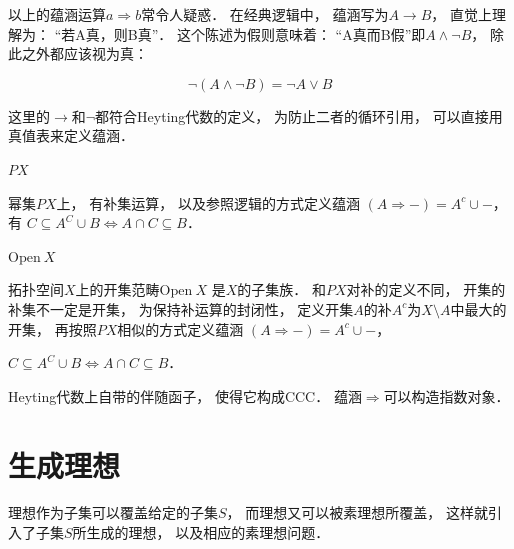 以上的蕴涵运算$a \Rightarrow b$常令人疑惑．
在经典逻辑中，
蕴涵写为$A \to B$，
直觉上理解为：
“若A真，则B真”．
这个陈述为假则意味着：
“A真而B假”即$A \wedge \neg B$，
除此之外都应该视为真：

$$
\neg (A \wedge \neg B) = \neg A \vee B
$$

这里的$\rightarrow$和$\neg$都符合Heyting代数的定义，
为防止二者的循环引用，
可以直接用真值表来定义蕴涵．

\begin{example}{$PX$}

幂集$PX$上，
有补集运算，
以及参照逻辑的方式定义蕴涵
$(A \Rightarrow -) = A^c \cup -$，
有
$C \subseteq A^C \cup B 
\Longleftrightarrow 
A \cap C \subseteq B$．

\end{example}

\begin{example}{$\text{Open} \ X$}

拓扑空间$X$上的开集范畴$\text{Open} \ X$
是$X$的子集族．
和$PX$对补的定义不同，
开集的补集不一定是开集，
为保持补运算的封闭性，
定义开集$A$的补$A^c$为$X \setminus A$中最大的开集，
再按照$PX$相似的方式定义蕴涵
$(A \Rightarrow -) = A^c \cup -$，

$C \subseteq A^C \cup B 
\Longleftrightarrow 
A \cap C \subseteq B$．

\end{example}

Heyting代数上自带的伴随函子，
使得它构成CCC．
蕴涵$\Rightarrow$可以构造指数对象．


\section{生成理想}

理想作为子集可以覆盖给定的子集$S$，
而理想又可以被素理想所覆盖，
这样就引入了子集$S$所生成的理想，
以及相应的素理想问题．

